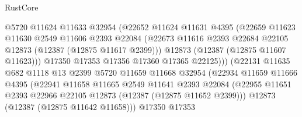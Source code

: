 \begin{lexlean}{RustCore}
\begin{coremodule}
                                @5720
                                @11624
                                @11633
                                @32954
                                (@22652
                                  @11624
                                  @11631
                                  @4395
                                  (@22659
                                    @11623
                                    @11630
                                    @2549
                                    @11606
                                    @2393
                                    @22084
                                    (@22673
                                      @11616
                                      @2393
                                      @22684
                                      @22105
                                      @12873
                                      (@12387 (@12875 @11617 @2399)))
                                    @12873
                                    (@12387 (@12875 @11607 @11623)))
                                  @17350
                                  @17353
                                  @17356
                                  @17360
                                  @17365
                                  @22125)))
                            (@22131
                              @11635
                              @682
                              @1118
                              @13
                              @2399
                              @5720
                              @11659
                              @11668
                              @32954
                              (@22934
                                @11659
                                @11666
                                @4395
                                (@22941
                                  @11658
                                  @11665
                                  @2549
                                  @11641
                                  @2393
                                  @22084
                                  (@22955
                                    @11651
                                    @2393
                                    @22966
                                    @22105
                                    @12873
                                    (@12387 (@12875 @11652 @2399)))
                                  @12873
                                  (@12387 (@12875 @11642 @11658)))
                                @17350
                                @17353

\end{coremodule}
\end{lexlean}
